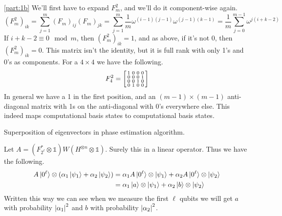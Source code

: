 \documentclass[boxes,pages]{homework}
\begin{document}
\begin{solution}
	\ref{part:1b}
	We'll first have to expand $F_m^2$, and we'll do it component-wise again.
	\begin{equation*}
		(F_m^2)_{ik} = \sum_{j = 1}^m(F_m)_{ij}(F_m)_{jk} = \sum_{j = 1}^m\frac{1}{m}\omega^{(i-1)(j-1)}\omega^{(j-1)(k-1)}  = \frac{1}{m}\sum_{j = 0}^{m - 1}\omega^{j(i + k - 2)}
	\end{equation*}
	If $i + k - 2 \equiv 0 \mod m$, then $(F_m^2)_{ik} = 1$, and as above, if it's not 0, then $(F_m^2)_{ik} = 0$. This matrix isn't the identity, but it is full rank with only 1's and 0's as components. For a $4\times 4$ we have the following.
	\begin{equation*}
		F_4^2 = \smqty[1 & 0 & 0 & 0 \\ 0 & 0 & 0 & 1 \\ 0 & 0 & 1 & 0 \\ 0 & 1 & 0 & 0]
	\end{equation*}
	In general we have a 1 in the first position, and an $(m-1)\times(m-1)$ anti-diagonal matrix with 1s on the anti-diagonal with 0's everywhere else. This indeed maps computational basis states to computational basis states.
\end{solution}

\begin{problem}
Superposition of eigenvectors in phase estimation algorithm.
\end{problem}

\begin{solution}
	Let $A = (F_{2^\ell}^*\otimes \mathbb{1})W(H^{\otimes n}\otimes \mathbb{1})$. Surely this in a linear operator. Thus we have the following.
	\begin{align*}
		A\ket*{0^\ell}\otimes\qty(\alpha_1\ket{\psi_1} + \alpha_2\ket{\psi_2}) & = \alpha_1A\ket*{0^\ell}\otimes\ket{\psi_1} + \alpha_2A\ket*{0^\ell}\otimes\ket{\psi_2} \\
		                                                                       & = \alpha_1\ket{a}\otimes\ket{\psi_1} + \alpha_2\ket{b}\otimes\ket{\psi_2}
	\end{align*}
	Written this way we can see when we measure the first $\ell$ qubits we will get $a$ with probability $\abs{\alpha_1}^2$ and $b$ with probability $\abs{\alpha_2}^2$.
\end{solution}
\end{document}
